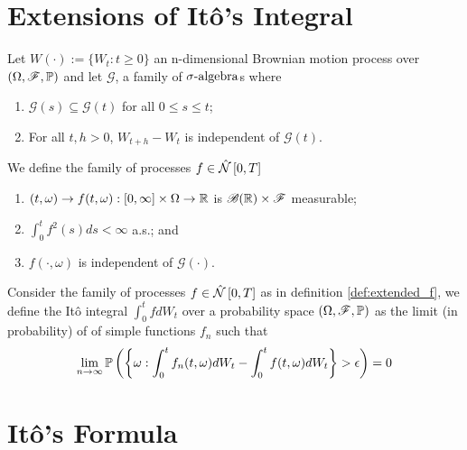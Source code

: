 \documentclass[../TGMAFFIRO.tex]{subfiles}
\begin{document}
\section{Extensions of It\^o's Integral}
\begin{definition}\label{def:extended_f}
	Let $W(\cdot) := \{W_t : t\geq 0\}$ an n-dimensional Brownian motion process over $(\Omega, \mathscr{F}, \mathbb{P})$ and let $\mathscr{G}$, a family of $\sigma\text{-algebra}$s where
	\begin{enumerate}
		\item $\mathscr{G}(s) \subseteq \mathscr{G}(t)$ for all $0\leq s \leq t$;
		\item For all $t, h > 0$, $W_{t+h} - W_t$ is independent of $\mathscr{G}(t)$.
	\end{enumerate}
	We define the family of processes $f\in\hat{\mathcal{N}}\left[0, T\right]$
	\begin{enumerate}
		\item $(t, \omega) \to f(t, \omega):[0, \infty]\times\Omega \to \mathbb{R}$ is $\mathscr{B}(\mathbb{R})\times\mathscr{F}$ measurable;
		\item $\int_0^t f^2(s) ds < \infty$ a.s.; and
		\item $f(\cdot, \omega)$ is independent of $\mathscr{G}(\cdot)$.
	\end{enumerate}
\end{definition}

\begin{definition}
	Consider the family of processes $f\in \hat{\mathcal{N}}\left[0, T\right]$ as in definition \ref{def:extended_f}, we define the It\^o integral $\int_0^t fdW_t$  over a probability space $(\Omega, \mathscr{F}, \mathbb{P})$ as the limit (in probability) of of simple functions $f_n$ such that
		\begin{equation}
		\lim_{n\to \infty} \mathbb{P}\left(\left\{\omega: \int_0^t f_n(t,\omega)dW_t - \int_0^t f(t,\omega)dW_t\right\}>\epsilon \right) = 0
	\end{equation}
\end{definition}

\section{It\^o's Formula}
\end{document}
